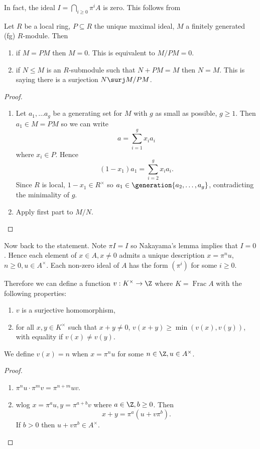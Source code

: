 \documentclass[a4paper]{article}
\DeclareMathOperator{\Frac}{Frac}
\begin{document}
In fact, the ideal \(I = \bigcap_{i \geq 0} \pi^i A\) is zero. This follows from
\begin{lemma}
  Let \(R\) be a local ring, \(P \subseteq R\) the unique maximal ideal, \(M\) a finitely generated (fg) \(R\)-module. Then
  \begin{enumerate}
  \item if \(M = P M\) then \(M = 0\). This is equivalent to \(M/PM = 0\).
  \item if \(N \leq M\) is an \(R\)-submodule such that \(N + PM = M\) then \(N = M\). This is saying there is a surjection \(N \surj M/PM\).
  \end{enumerate}
\end{lemma}

\begin{proof}\leavevmode
  \begin{enumerate}
  \item Let \(a_1, \dots a_g\) be a generating set for \(M\) with \(g\) as small as possible, \(g \geq 1\). Then \(a_1 \in M = PM\) so we can write
    \[
      a = \sum_{i = 1}^g x_i a_i
    \]
    where \(x_i \in P\). Hence
    \[
      (1 - x_1) a_1 = \sum_{i = 2}^g x_i a_i.
    \]
    Since \(R\) is local, \(1 - x_1 \in R^\times\) so \(a_1 \in \generation{a_2, \dots, a_g}\), contradicting the minimality of \(g\).
  \item Apply first part to \(M/N\).
  \end{enumerate}
\end{proof}

Now back to the statement. Note \(\pi I = I\) so Nakayama's lemma implies that \(I = 0\). Hence each element of \(x \in A, x \neq 0\) admits a unique description \(x = \pi^n u\), \(n \geq 0, u \in A^\times\). Each non-zero ideal of \(A\) has the form \((\pi^i)\) for some \(i \geq 0\).

Therefore we can define a function \(v: K^\times \to \Z\) where \(K = \Frac A\) with the following properties:
\begin{enumerate}
\item \(v\) is a surjective homomorphism,
\item for all \(x, y \in K^\times\) such that \(x + y \neq 0\), \(v(x + y) \geq \min(v(x), v(y))\), with equality if \(v(x) \neq v(y)\).
\end{enumerate}
We define \(v(x) = n\) when \(x = \pi^n u\) for some \(n \in \Z, u \in A^\times\).

\begin{proof}\leavevmode
  \begin{enumerate}
  \item \(\pi^n u \cdot \pi^m v = \pi^{n + m} uv\).
  \item wlog \(x = \pi^a u, y = \pi^{a + b} v\) where \(a \in \Z, b \geq 0\). Then
    \[
      x + y = \pi^a(u + v \pi^ b).
    \]
    If \(b > 0\) then \(u + v \pi^b \in A^\times\).
  \end{enumerate}
\end{proof}
\end{document}
